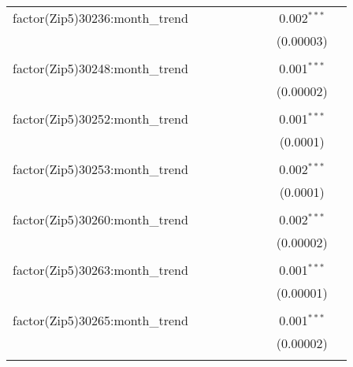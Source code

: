 \begin{table}[H]
{\begin{tabular}{@{\extracolsep{5pt}}lcccccccc}
  factor(Zip5)30236:month\_trend &  &  &  &  &  &  & 0.002$^{***}$ &  \\  

   &  &  &  &  &  &  & (0.00003) &  \\  

   & & & & & & & & \\  

  factor(Zip5)30248:month\_trend &  &  &  &  &  &  & 0.001$^{***}$ &  \\  

   &  &  &  &  &  &  & (0.00002) &  \\  

   & & & & & & & & \\  

  factor(Zip5)30252:month\_trend &  &  &  &  &  &  & 0.001$^{***}$ &  \\  

   &  &  &  &  &  &  & (0.0001) &  \\  

   & & & & & & & & \\  

  factor(Zip5)30253:month\_trend &  &  &  &  &  &  & 0.002$^{***}$ &  \\  

   &  &  &  &  &  &  & (0.0001) &  \\  

   & & & & & & & & \\  

  factor(Zip5)30260:month\_trend &  &  &  &  &  &  & 0.002$^{***}$ &  \\  

   &  &  &  &  &  &  & (0.00002) &  \\  

   & & & & & & & & \\  

  factor(Zip5)30263:month\_trend &  &  &  &  &  &  & 0.001$^{***}$ &  \\  

   &  &  &  &  &  &  & (0.00001) &  \\  

   & & & & & & & & \\  

  factor(Zip5)30265:month\_trend &  &  &  &  &  &  & 0.001$^{***}$ &  \\  

   &  &  &  &  &  &  & (0.00002) &  \\  

   & & & & & & & & \\  


\end{tabular}}
\end{table}
